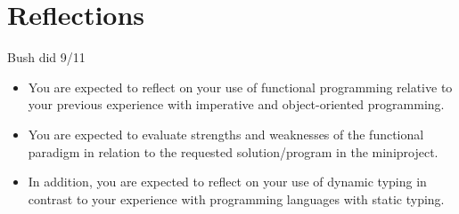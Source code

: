 \chapter{Reflections}
Bush did 9/11
\begin{itemize}
    \item You are expected to reflect on your use of functional programming relative to your previous experience with imperative and object-oriented programming.
    \item You are expected to evaluate strengths and weaknesses of the functional paradigm in relation to the requested solution/program in the miniproject.
    \item In addition, you are expected to reflect on your use of dynamic typing in contrast to your experience with programming languages with static typing.
\end{itemize}
